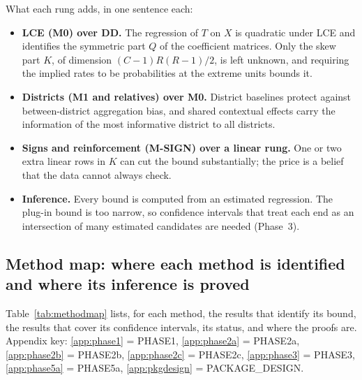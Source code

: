 What each rung adds, in one sentence each:
\begin{itemize}[nosep]
\item \textbf{LCE (M0) over DD.} The regression of $T$ on $X$ is quadratic under
LCE and identifies the symmetric part $Q$ of the coefficient matrices. Only the
skew part $K$, of dimension $(C-1)R(R-1)/2$, is left unknown, and requiring the
implied rates to be probabilities at the extreme units bounds it.
\item \textbf{Districts (M1 and relatives) over M0.} District baselines protect
against between-district aggregation bias, and shared contextual effects carry
the information of the most informative district to all districts.
\item \textbf{Signs and reinforcement (M-SIGN) over a linear rung.} One or two
extra linear rows in $K$ can cut the bound substantially; the price is a
belief that the data cannot always check.
\item \textbf{Inference.} Every bound is computed from an estimated regression.
The plug-in bound is too narrow, so confidence intervals that treat each end
as an intersection of many estimated candidates are needed (Phase~3).
\end{itemize}

\subsection{Method map: where each method is identified and where its inference is proved}

Table~\ref{tab:methodmap} lists, for each method, the results that identify its
bound, the results that cover its confidence intervals, its status, and where the
proofs are. Appendix key: \ref{app:phase1} = PHASE1, \ref{app:phase2a} = PHASE2a,
\ref{app:phase2b} = PHASE2b, \ref{app:phase2c} = PHASE2c, \ref{app:phase3} = PHASE3,
\ref{app:phase5a} = PHASE5a, \ref{app:pkgdesign} = PACKAGE\_DESIGN.

